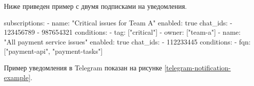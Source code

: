 Ниже приведен пример с двумя подписками на уведомления.

\begin{nocode}
subscriptions:
  - name: "Critical issues for Team A"
    enabled: true
    chat_ids:
      - 123456789
      - 987654321
    conditions:
      - tag: ["critical"] 
      - owner: ["team-a"]
  - name: "All payment service issues"
    enabled: true
    chat_ids:
      - 112233445 
    conditions:
      - fqn: ["payment-api", "payment-tasks"]
\end{nocode}

Пример уведомления в Telegram показан на рисунке \ref{telegram-notification-example}.
